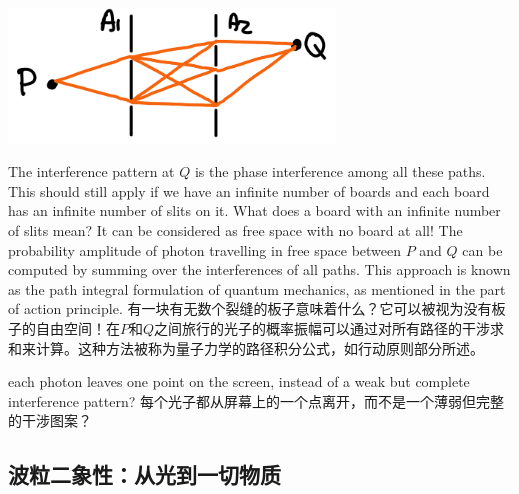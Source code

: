 {{{{                \begin{center}\includegraphics[width=0.65\textwidth]{dspi2}\end{center}
            }
            The interference pattern at $Q$ is the phase interference among all these paths. This should still apply if we have an infinite number of boards and each board has an infinite number of slits on it.
            \tcblower
            What does a board with an infinite number of slits mean? It can be considered as free space with no board at all! The probability amplitude of photon travelling in free space between $P$ and $Q$ can be computed by summing over the interferences of all paths. This approach is known as the path integral formulation of quantum mechanics, as mentioned in the part of action principle.
            有一块有无数个裂缝的板子意味着什么？它可以被视为没有板子的自由空间！在$P$和$Q$之间旅行的光子的概率振幅可以通过对所有路径的干涉求和来计算。这种方法被称为量子力学的路径积分公式，如行动原则部分所述。
        }
        each photon leaves one point on the screen, instead of a weak but complete interference pattern?
        每个光子都从屏幕上的一个点离开，而不是一个薄弱但完整的干涉图案？
    }
}

\subsection{波粒二象性：从光到一切物质}



